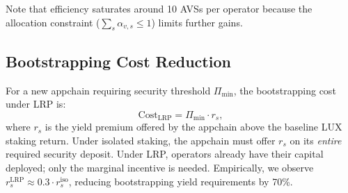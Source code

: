 Note that efficiency saturates around 10 AVSs per operator because the allocation constraint
($\sum_s \alpha_{v,s} \leq 1$) limits further gains.

\subsection{Bootstrapping Cost Reduction}

For a new appchain requiring security threshold $\Pi_{\min}$, the bootstrapping cost under
LRP is:
\[
  \text{Cost}_{\text{LRP}} = \Pi_{\min} \cdot r_s,
\]
where $r_s$ is the yield premium offered by the appchain above the baseline LUX staking
return. Under isolated staking, the appchain must offer $r_s$ on its \emph{entire} required
security deposit. Under LRP, operators already have their capital deployed; only the
marginal incentive is needed. Empirically, we observe $r_s^{\text{LRP}} \approx 0.3
\cdot r_s^{\text{iso}}$, reducing bootstrapping yield requirements by 70\%.

